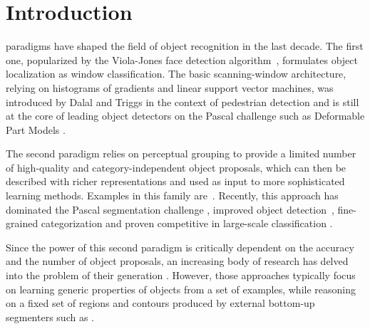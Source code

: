 \documentclass[10pt,journal,cspaper,compsoc]{IEEEtran}
\begin{document}
%
\IEEEpeerreviewmaketitle

\section{Introduction}
 paradigms have shaped the field of object recognition in the last decade. The first one, popularized by the Viola-Jones face detection algorithm~\cite{viola_jones:IJCV04}, formulates object localization as window classification. 
The basic scanning-window architecture, relying on histograms of gradients and linear support vector machines, was introduced by Dalal and Triggs \cite{dalal_triggs:CVPR05} in the context of pedestrian detection and is still at the core of leading object detectors on the Pascal challenge such as Deformable Part Models \cite{FelzenszwalbTPAMI2010}.

The second paradigm relies on perceptual grouping to provide a limited number of high-quality and category-independent object proposals, which can then be described with richer representations and used as input to more sophisticated learning methods.
Examples in this family are~\cite{Malisiewicz2007,Gu_etal:cvpr2009}. Recently, this approach has dominated the Pascal segmentation challenge \cite{Carreira2012b,Arbelaez2012,o2p}, improved object detection~\cite{Girshick:cvpr2014}, fine-grained categorization \cite{Zhang2014} and proven competitive in large-scale classification \cite{Uijlings2013}.

Since the power of this second paradigm is critically dependent on the accuracy and the number of object proposals, an increasing body of research has delved into the problem of their generation \cite{Kraehenbuehl2014,Rantalankila2014,Humayun2014,Uijlings2013,Alexe2012,Kim2012,Carreira2012b,Uijlings2013,Endres2014}.
However, those approaches typically focus on learning generic properties of objects from a set of examples, while reasoning on a fixed set of regions and contours produced by external bottom-up segmenters such as \cite{Arbelaez2011,Felzenszwalb2004}. 
\end{document}
